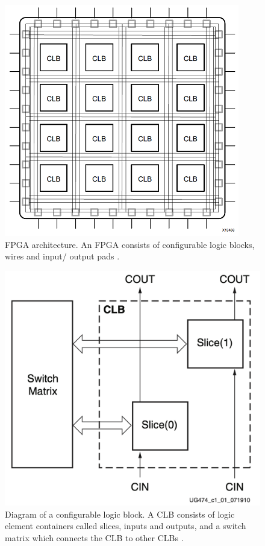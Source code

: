 \documentclass[12pt]{report}
\begin{document}
\begin{figure}[h]
    \centering
    \includegraphics[scale=0.55]{figures/basic_fpga.png}
    \caption{FPGA architecture. An FPGA consists of configurable logic blocks, wires and input/ output pads \citep{XilFPGAArch}.}
    \label{fig:2}
\end{figure}

\begin{figure}[h]
    \centering
    \includegraphics[scale=0.25]{figures/clb.png}
    \caption{Diagram of a configurable logic block. A CLB consists of logic element containers called slices, inputs and outputs, and a switch matrix which connects the CLB to other CLBs \citep{XilClbMan}.}
    \label{fig:3}
\end{figure}
\end{document}

